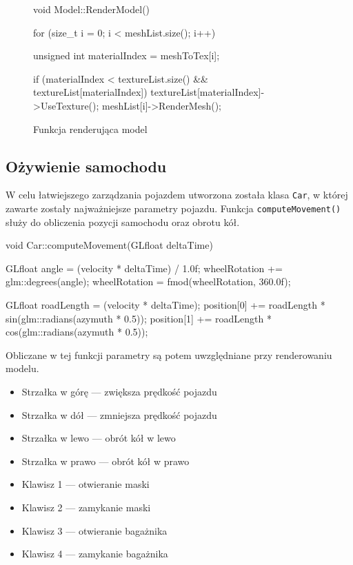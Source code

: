 \documentclass[a4paper,12pt]{article}
\numberwithin{equation}{section}
\begin{document}
\begin{figure}[H]
\begin{cppcode}
void Model::RenderModel()
{
	for (size_t i = 0; i < meshList.size(); i++) {
		unsigned int materialIndex = meshToTex[i];

		if (materialIndex < textureList.size() && textureList[materialIndex]) {
			textureList[materialIndex]->UseTexture();
		}
		meshList[i]->RenderMesh();
	}
}
\end{cppcode}
\caption{Funkcja renderująca model}
\end{figure}



\subsection{Ożywienie samochodu}

W celu łatwiejszego zarządzania pojazdem utworzona została klasa \texttt{Car}, w której zawarte zostały najważniejsze parametry pojazdu. Funkcja \texttt{computeMovement()} służy do obliczenia pozycji samochodu oraz obrotu kół.

\begin{cppcode}
void Car::computeMovement(GLfloat deltaTime)
{
	GLfloat angle = (velocity * deltaTime) / 1.0f;
	wheelRotation += glm::degrees(angle);
	wheelRotation = fmod(wheelRotation, 360.0f);

	GLfloat roadLength = (velocity * deltaTime);
	position[0] += roadLength * sin(glm::radians(azymuth * 0.5));
	position[1] += roadLength * cos(glm::radians(azymuth * 0.5));
}
\end{cppcode}

Obliczane w tej funkcji parametry są potem uwzględniane przy renderowaniu modelu.

\begin{itemize}
\item Strzałka w górę — zwiększa prędkość pojazdu
\item Strzałka w dół — zmniejsza prędkość pojazdu
\item Strzałka w lewo — obrót kół w lewo
\item Strzałka w prawo — obrót kół w prawo

\item Klawisz 1 — otwieranie maski
\item Klawisz 2 — zamykanie maski
\item Klawisz 3 — otwieranie bagażnika
\item Klawisz 4 — zamykanie bagażnika
\end{itemize}
\end{document}
